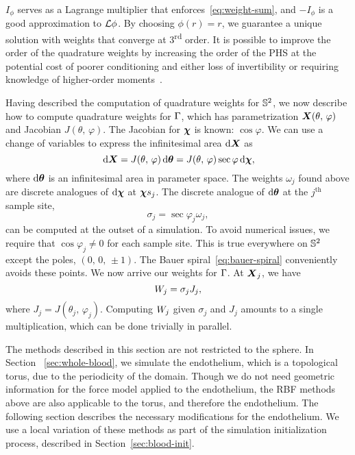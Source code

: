 $I_{\phi}$ serves as a Lagrange multiplier that enforces~\eqref{eq:weight-sum}, and
$-I_\phi$ is a good approximation to $\mathcal{L}\phi$. By choosing $\phi(r) = r$, we guarantee a
unique solution with weights that converge at 3\textsuperscript{rd} order.  It is
possible to improve the order of the quadrature weights by increasing the order of the
PHS at the potential cost of poorer conditioning and either loss of invertibility or
requiring knowledge of higher-order moments~\cite{Fuselier:2013coba}.

Having described the computation of quadrature weights for $\mathbb{S}^2$, we now
describe how to compute quadrature weights for $\Gamma$, which has parametrization
$\boldsymbol{X}(\theta,\,\varphi)$ and Jacobian $J(\theta,\,\varphi)$. The Jacobian for $\boldsymbol{\chi}$ is
known: $\cos\varphi$.  We can use a change of variables to express the infinitesimal area
$\d\X$ as
\begin{equation}\label{eq:quad-cov}
    \d\X
    = J(\theta,\,\varphi)\d\qs
    = J(\theta,\,\varphi)\sec\varphi\d\Xp,
\end{equation}
where $\d\qs$ is an infinitesimal area in parameter space. The weights $\omega_j$ found
above are discrete analogues of $\d\Xp$ at $\sample\Xp_j$. The discrete analogue of
$\d\qs$ at the $j^\text{th}$ sample site,
\begin{equation*}
    \sigma_j=\sec\varphi_j\omega_j,
\end{equation*}
can be computed at the outset of a simulation. To avoid numerical issues, we require that
$\cos\varphi_j \neq 0$ for each sample site. This is true everywhere on $\mathbb{S}^2$ except
the poles, $(0,\,0,\,\pm1)$. The Bauer spiral~\eqref{eq:bauer-spiral} conveniently avoids
these points. We now arrive our weights for $\Gamma$. At $\boldsymbol{X}_j$, we have
\begin{equation}
    \weight[j] = \sigma_j J_j,
\end{equation}
where $J_j = J(\theta_j,\,\varphi_j)$. Computing $\weight[j]$ given $\sigma_j$ and $J_j$
amounts to a single multiplication, which can be done trivially in parallel.

The methods described in this section are not restricted to the sphere. In Section~%
\ref{sec:whole-blood}, we simulate the endothelium, which is a topological torus, due to
the periodicity of the domain. Though we do not need geometric information for the force
model applied to the endothelium, the RBF methods above are also applicable to the torus,
and therefore the endothelium. The following section describes the necessary
modifications for the endothelium. We use a local variation of these methods as part of
the simulation initialization process, described in Section~\ref{sec:blood-init}.
